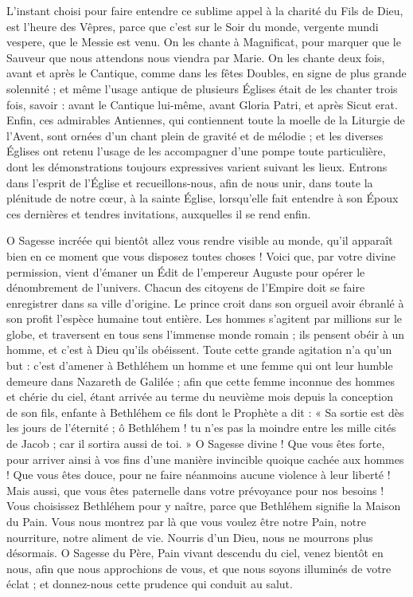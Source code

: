 \documentclass[%
fontsize=10%
,a6paper%
,DIV=15%
]{scrartcl}
\begin{document}
L’instant choisi pour faire entendre ce sublime appel à la charité du Fils de Dieu, est l’heure des Vêpres, parce que c’est sur le Soir du monde, vergente mundi vespere, que le Messie est venu. On les chante à Magnificat, pour marquer que le Sauveur que nous attendons nous viendra par Marie. On les chante deux fois, avant et après le Cantique, comme dans les fêtes Doubles, en signe de plus grande solennité ; et même l’usage antique de plusieurs Églises était de les chanter trois fois, savoir : avant le Cantique lui-même, avant Gloria Patri, et après Sicut erat. Enfin, ces admirables Antiennes, qui contiennent toute la moelle de la Liturgie de l’Avent, sont ornées d’un chant plein de gravité et de mélodie ; et les diverses Églises ont retenu l’usage de les accompagner d’une pompe toute particulière, dont les démonstrations toujours expressives varient suivant les lieux. Entrons dans l’esprit de l’Église et recueillons-nous, afin de nous unir, dans toute la plénitude de notre cœur, à la sainte Église, lorsqu’elle fait entendre à son Époux ces dernières et tendres invitations, auxquelles il se rend enfin.

O Sagesse incréée qui bientôt allez vous rendre visible au monde, qu’il apparaît bien en ce moment que vous disposez toutes choses ! Voici que, par votre divine permission, vient d’émaner un Édit de l’empereur Auguste pour opérer le dénombrement de l’univers. Chacun des citoyens de l’Empire doit se faire enregistrer dans sa ville d’origine. Le prince croit dans son orgueil avoir ébranlé à son profit l’espèce humaine tout entière. Les hommes s’agitent par millions sur le globe, et traversent en tous sens l’immense monde romain ; ils pensent obéir à un homme, et c’est à Dieu qu’ils obéissent. Toute cette grande agitation n’a qu’un but : c’est d’amener à Bethléhem un homme et une femme qui ont leur humble demeure dans Nazareth de Galilée ; afin que cette femme inconnue des hommes et chérie du ciel, étant arrivée au terme du neuvième mois depuis la conception de son fils, enfante à Bethléhem ce fils dont le Prophète a dit : « Sa sortie est dès les jours de l’éternité ; ô Bethléhem ! tu n’es pas la moindre entre les mille cités de Jacob ; car il sortira aussi de toi. » O Sagesse divine ! Que vous êtes forte, pour arriver ainsi à vos fins d’une manière invincible quoique cachée aux hommes ! Que vous êtes douce, pour ne faire néanmoins aucune violence à leur liberté ! Mais aussi, que vous êtes paternelle dans votre prévoyance pour nos besoins ! Vous choisissez Bethléhem pour y naître, parce que Bethléhem signifie la Maison du Pain. Vous nous montrez par là que vous voulez être notre Pain, notre nourriture, notre aliment de vie. Nourris d’un Dieu, nous ne mourrons plus désormais. O Sagesse du Père, Pain vivant descendu du ciel, venez bientôt en nous, afin que nous approchions de vous, et que nous soyons illuminés de votre éclat ; et donnez-nous cette prudence qui conduit au salut.
\end{document}
